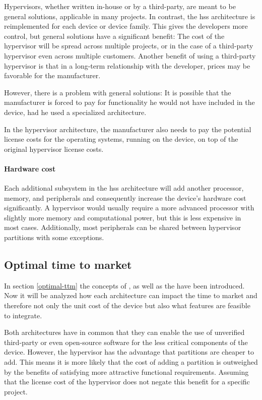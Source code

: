 Hypervisors, whether written in-house or by a third-party, are meant to be general solutions, applicable in many projects. In contrast, the \acrshort{hss} architecture is reimplemented for each device or device family. This gives the developers more control, but general solutions have a significant benefit: The cost of the hypervisor will be spread across multiple projects, or in the case of a third-party hypervisor even across multiple customers. Another benefit of using a third-party hypervisor is that in a long-term relationship with the developer, prices may be favorable for the manufacturer.

However, there is a problem with general solutions: It is possible that the manufacturer is forced to pay for functionality he would not have included in the device, had he used a specialized architecture. 

In the hypervisor architecture, the manufacturer also needs to pay the potential license costs for the operating systems, running on the device, on top of the original hypervisor license costs.

\paragraph{Hardware cost}
Each additional subsystem in the \acrshort{hss} architecture will add another processor, memory, and peripherals and consequently increase the device's hardware cost significantly. A hypervisor would usually require a more advanced processor with slightly more memory and computational power, but this is less expensive in most cases. Additionally, most peripherals can be shared between hypervisor partitions with some exceptions.  

\subsection{Optimal time to market}
In section \ref{optimal-ttm} the concepts of , as well as the have been introduced. Now it will be analyzed how each architecture can impact the time to market and therefore not only the unit cost of the device but also what features are feasible to integrate.

Both architectures have in common that they can enable the use of unverified third-party or even open-source software for the less critical components of the device. However, the hypervisor has the advantage that partitions are cheaper to add. This means it is more likely that the cost of adding a partition is outweighed by the benefits of satisfying more attractive functional requirements. Assuming that the license cost of the hypervisor does not negate this benefit for a specific project.

